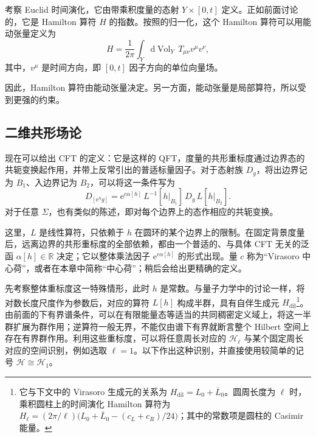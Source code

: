 \begin{example*}
考察 Euclid 时间演化，它由带乘积度量的态射 $Y\times[0,t]$ 定义。正如前面讨论的，它是 Hamilton 算符 $H$ 的指数。按照的归一化，这个 Hamilton 算符可以用能动张量定义为
\[
H=\frac1{2\pi}\int_Y\mathrm{d}\operatorname{Vol}_Y\,
T_{\mu\nu}v^\mu v^\nu,
\]
其中，$v^\mu$ 是时间方向，即 $[0,t]$ 因子方向的单位向量场。
\end{example*}

因此，Hamilton 算符由能动张量决定。另一方面，能动张量是局部算符，所以受到更强的约束。

\subsection{二维共形场论}\label{sec:3.2.2}

\begin{definition*}\label{def:3.cft}
现在可以给出 CFT 的定义：它是这样的 QFT，度量的共形重标度通过边界态的共轭变换起作用，并带上反常引出的普适标量因子。对于态射族 $D_g$，将出边界记为 $B_1$、入边界记为 $B_2$，可以将这一条件写为
\begin{equation}\label{eq:3.28}
D_{[\mathrm{e}^{h}g]}
=\mathrm{e}^{c\alpha[h]}\,
L^{-1}[h|_{B_1}]\,D_g\,L[h|_{B_2}].
\end{equation}
对于任意 $\Sigma$，也有类似的陈述，即对每个边界上的态作相应的共轭变换。
\end{definition*}

这里，$L$ 是线性算符，只依赖于 $h$ 在圆环的某个边界上的限制。在固定背景度量后，远离边界的共形重标度的全部依赖，都由一个普适的、与具体 CFT 无关的泛函 $\alpha[h]\in\mathbb{R}$ 决定；它以整体乘法因子 $\mathrm{e}^{c\alpha[h]}$ 的形式出现。量 $c$ 称为“Virasoro 中心荷”，或者在本章中简称“中心荷”；稍后会给出更精确的定义。

先考察整体重标度这一特殊情形，此时 $h$ 是常数。与量子力学中的讨论一样，将对数长度尺度作为参数后，对应的算符 $L[h]$ 构成半群，具有自伴生成元 $H_{\mathrm{dil}}$\footnote{它与下文中的 Virasoro 生成元的关系为 $H_{\mathrm{dil}}=L_0+\overline{L}_0$。圆周长度为 $\ell$ 时，乘积圆柱上的时间演化 Hamilton 算符为 $H_\ell=(2\pi/\ell)\bigl(L_0+\overline{L}_0-(c_L+c_R)/24\bigr)$；其中的常数项是圆柱的 Casimir 能量。}。由前面的下有界谱条件，可以在有限能量态等适当的共同稠密定义域上，将这一半群扩展为群作用；逆算符一般无界，不能仅由谱下有界就断言整个 Hilbert 空间上存在有界群作用。利用这些重标度，可以将任意周长对应的 $\mathcal{H}_\ell$ 与某个固定周长对应的空间识别，例如选取 $\ell=1$。以下作出这种识别，并直接使用较简单的记号 $\mathcal{H}\cong\mathcal{H}_1$。

